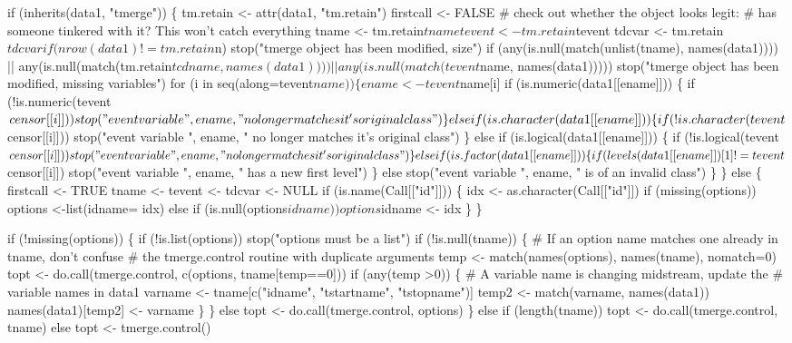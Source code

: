 \documentclass{article}
\begin{document}
\begin{nwchunk}
 if (inherits(data1, "tmerge")) \{
     tm.retain <- attr(data1, "tm.retain")
     firstcall <- FALSE
     # check out whether the object looks legit:
     #  has someone tinkered with it?  This won't catch everything
     tname <- tm.retain$tname
     tevent <- tm.retain$tevent
     tdcvar <- tm.retain$tdcvar
     if (nrow(data1) != tm.retain$n)
         stop("tmerge object has been modified, size")
     if (any(is.null(match(unlist(tname), names(data1)))) ||
         any(is.null(match(tm.retain$tcdname, names(data1)))) ||
         any(is.null(match(tevent$name, names(data1)))))
         stop("tmerge object has been modified, missing variables")
     for (i in seq(along=tevent$name)) \{
         ename <- tevent$name[i]
         if (is.numeric(data1[[ename]])) \{
             if (!is.numeric(tevent$censor[[i]]))
                 stop("event variable ", ename, 
                      " no longer matches it's original class")
         \}
         else if (is.character(data1[[ename]])) \{
             if (!is.character(tevent$censor[[i]]))
                 stop("event variable ", ename, 
                      " no longer matches it's original class")
         \}
         else if (is.logical(data1[[ename]])) \{
             if (!is.logical(tevent$censor[[i]]))
                 stop("event variable ", ename,
                      " no longer matches it's original class")
         \}
         else if (is.factor(data1[[ename]])) \{
             if (levels(data1[[ename]])[1] != tevent$censor[[i]])
                 stop("event variable ", ename,
                      " has a new first level")
         \}
         else stop("event variable ", ename, " is of an invalid class")
     \}
 \} else \{
     firstcall <- TRUE
     tname <- tevent <- tdcvar <- NULL
     if (is.name(Call[["id"]])) \{
         idx <- as.character(Call[["id"]])
         if (missing(options)) options <-list(idname= idx)
         else if (is.null(options$idname)) options$idname <- idx
     \}
 \}
 
 if (!missing(options)) \{
     if (!is.list(options)) stop("options must be a list")
     if (!is.null(tname)) \{
         # If an option name matches one already in tname, don't confuse
         #  the tmerge.control routine with duplicate arguments
         temp <- match(names(options), names(tname), nomatch=0)
         topt <- do.call(tmerge.control, c(options, tname[temp==0]))
         if (any(temp >0)) \{
             # A variable name is changing midstream, update the
             # variable names in data1
             varname <- tname[c("idname", "tstartname", "tstopname")]
             temp2 <- match(varname, names(data1))
             names(data1)[temp2] <- varname
         \}
     \}
     else topt <- do.call(tmerge.control, options)
 \}
 else if (length(tname)) topt <- do.call(tmerge.control, tname)
 else  topt <- tmerge.control()
 

\end{nwchunk}
\end{document}

